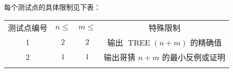 \documentclass{statement}
\begin{document}
    每个测试点的具体限制见下表：
    \begin{center}
        \begin{tabular}{c|c|c|c}
            \Xhline{4\arrayrulewidth}
            测试点编号 & $n\leq$ & $m\leq$ & 特殊限制\\
            \Xhline{2\arrayrulewidth}
            1 & $2$ & $2$ & 输出 $\operatorname{TREE}(n+m)$ 的精确值\\
            \hline
            2 & $1$ & $1$ & 输出哥猜 $n+m$ 的最小反例或证明\\
            \Xhline{4\arrayrulewidth}
        \end{tabular}
    \end{center}
\end{document}
